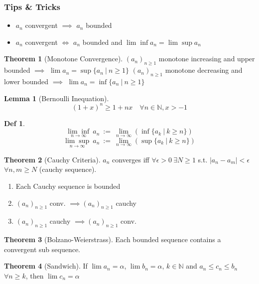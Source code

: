 \documentclass[a4paper, 10pt]{article}
\newtheorem*{lemma}{Lemma}
\theoremstyle{definition}
\newtheorem*{definition}{Def}
\theoremstyle{named}
\newtheorem*{ntheorem_wrapper}{Theorem}
\newenvironment{ntheorem}%
    {\begin{mdframed}[style=important]\begin{ntheorem_wrapper}}%
    {\end{ntheorem_wrapper}\end{mdframed}}
\newcommand{\N}{\mathbb{N}}
\begin{document}
\subsubsection{Tips \& Tricks}
\begin{itemize}
    \item $a_n$ convergent $\implies$ $a_n$ bounded
    \item $a_n$ convergent $\iff$ $a_n$ bounded and $\lim\inf a_n = \lim\sup a_n$
\end{itemize}

\begin{ntheorem}[Monotone Convergence]
    $(a_n)_{n \geq 1}$ monotone increasing and upper bounded $\implies$ $\lim a_n = \sup\{a_n \ | \ n\geq 1\}$ \newline
    $(a_n)_{n \geq 1}$ monotone decreasing and lower bounded $\implies$ $\lim a_n = \inf\{a_n \ | \ n\geq 1\}$
\end{ntheorem}

\begin{lemma}[Bernoulli Inequation]
    $$(1 + x)^n \geq 1 + nx \quad \forall n \in \N, x > -1$$
\end{lemma}

\begin{definition}
    $$\underset{n\to\infty}{\lim\inf} \ a_n \ := \ \lim_{n\to\infty} (\inf \{a_k \ | \ k \geq n\})$$
    $$\underset{n\to\infty}{\lim\sup} \ a_n \ := \ \lim_{n\to\infty} (\sup \{a_k \ | \ k \geq n\})$$
\end{definition}

\begin{ntheorem}[Cauchy Criteria]
    $a_n$ converges iff $\forall \epsilon > 0 \ \exists N \geq 1$ s.t. $|a_n - a_m| < \epsilon$ $\forall n,m \geq N$ (cauchy sequence).
    \begin{enumerate}[label=(\roman*)]
        \item Each Cauchy sequence is bounded
        \item $(a_n)_{n \geq 1}$ conv. $\implies (a_n)_{n \geq 1}$ cauchy
        \item $(a_n)_{n \geq 1}$ cauchy $\implies (a_n)_{n \geq 1}$ conv.
    \end{enumerate}
\end{ntheorem}

\begin{ntheorem}[Bolzano-Weierstrass]
    Each bounded sequence contains a convergent sub sequence.
\end{ntheorem}

\begin{ntheorem}[Sandwich]
    If $\lim a_n = \alpha$, $\lim b_n = \alpha$, $k \in \N$ and $a_n \leq c_n \leq b_n$ $\forall n \geq k$, then $\lim c_n = \alpha$
\end{ntheorem}
\end{document}

